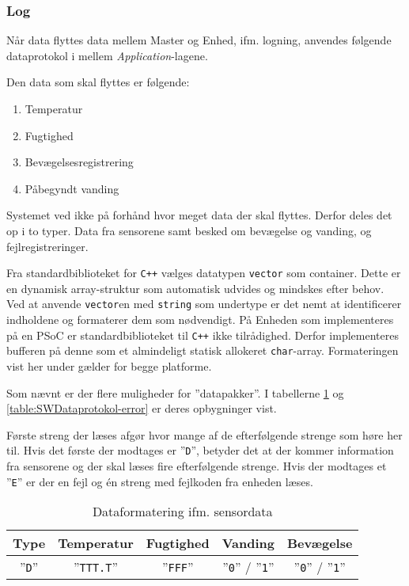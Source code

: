 
\subsubsection{Log}

Når data flyttes data mellem Master og Enhed, ifm. logning, anvendes følgende dataprotokol i mellem \textit{Application}-lagene.

Den data som skal flyttes er følgende:

\begin{enumerate}
	\item Temperatur
	\item Fugtighed
	\item Bevægelsesregistrering
	\item Påbegyndt vanding
\end{enumerate}

Systemet ved ikke på forhånd hvor meget data der skal flyttes. Derfor deles det op i to typer. Data fra sensorene samt besked om bevægelse og vanding, og fejlregistreringer.

Fra standardbiblioteket for \verb'C++' vælges datatypen \verb+vector+ som container. Dette er en dynamisk array-struktur som automatisk udvides og mindskes efter behov.
Ved at anvende \verb+vector+en med \verb+string+ som undertype er det nemt at identificerer indholdene og formaterer dem som nødvendigt. På Enheden som implementeres på en PSoC er standardbiblioteket til \verb-C++- ikke tilrådighed. Derfor implementeres bufferen på denne som et almindeligt statisk allokeret \verb+char+-array. Formateringen vist her under gælder for begge platforme.

Som nævnt er der flere muligheder for ''datapakker''. I tabellerne \ref{table:SWDataprotokol-sensor} og \ref{table:SWDataprotokol-error} er deres opbygninger vist.

Første streng der læses afgør hvor mange af de efterfølgende strenge som høre her til. Hvis det første der modtages er ''\verb+D+'', betyder det at der kommer information fra sensorene og der skal læses fire efterfølgende strenge.
Hvis der modtages et ''\verb+E+'' er der en fejl og én streng med fejlkoden fra enheden læses.

\begin{table}[h]
	\caption{Dataformatering ifm. sensordata}
	\centering
	\begin{tabular}{|c|c|c|c|c|}
		\hline 
		\textbf{Type} & \textbf{Temperatur} & \textbf{Fugtighed} & \textbf{Vanding} & \textbf{Bevægelse}\\ 
		\hline 
		''\verb+D+'' & ''\verb+TTT.T+'' & ''\verb+FFF+'' & ''\verb+0+'' / ''\verb+1+'' & ''\verb+0+'' / ''\verb+1+'' \\ 
		\hline 
	\end{tabular} 
	\label{table:SWDataprotokol-sensor}
\end{table}

